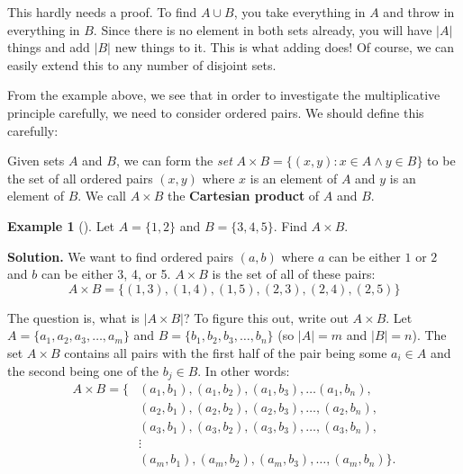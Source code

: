 \documentclass[10pt,]{book}
\newcommand{\terminology}[1]{\textbf{#1}}
\theoremstyle{plain}
\theoremstyle{definition}
\theoremstyle{definition}
\newtheorem{example}[theorem]{Example}
\theoremstyle{definition}
\theoremstyle{definition}
\numberwithin{equation}{chapter}
\newcommand{\st}{:}
\newcommand{\card}[1]{\left| #1 \right|}
\newcommand{\amp}{&}
\begin{document}
\hypertarget{p-709}{}%
This hardly needs a proof. To find \(A \cup B\), you take everything in \(A\) and throw in everything in \(B\). Since there is no element in both sets already, you will have \(\card{A}\) things and add \(\card{B}\) new things to it. This is what adding does! Of course, we can easily extend this to any number of disjoint sets.%
\par
\hypertarget{p-710}{}%
From the example above, we see that in order to investigate the multiplicative principle carefully, we need to consider ordered pairs. We should define this carefully:%
\begin{assemblage}\label{assemblage-14}
\hypertarget{p-711}{}%
Given sets \(A\) and \(B\), we can form the \emph{set} \(A \times B = \{(x,y) \st x \in A \wedge y \in B\}\) to be the set of all ordered pairs \((x,y)\) where \(x\) is an element of \(A\) and \(y\) is an element of \(B\). We call \(A \times B\) the \terminology{Cartesian product} of \(A\) and \(B\).%
\end{assemblage}
\begin{example}[]\label{example-40}
\hypertarget{p-712}{}%
Let \(A = \{1,2\}\) and \(B=\{3,4,5\}\). Find \(A \times B\).%
\par\smallskip%
\noindent\textbf{Solution.}\hypertarget{solution-81}{}\quad%
\hypertarget{p-713}{}%
We want to find ordered pairs \((a,b)\) where \(a\) can be either \(1\) or \(2\) and \(b\) can be either 3, 4, or 5. \(A \times B\) is the set of all of these pairs:%
\begin{equation*}
A \times B = \{(1,3), (1,4), (1,5), (2,3), (2,4), (2,5)\}
\end{equation*}
%
\end{example}
\hypertarget{p-714}{}%
The question is, what is \(\card{A \times B}\)? To figure this out, write out \(A \times B\). Let \(A = \{a_1,a_2, a_3, \ldots, a_m\}\) and \(B = \{b_1,b_2, b_3, \ldots, b_n\}\) (so \(\card{A} = m\) and \(\card{B} = n\)). The set \(A \times B\) contains all pairs with the first half of the pair being some \(a_i \in A\) and the second being one of the \(b_j \in B\). In other words:%
\begin{align*}
A \times B = \{ \amp (a_1, b_1), (a_1, b_2), (a_1, b_3), \ldots (a_1, b_n),\\
\amp (a_2, b_1), (a_2, b_2), (a_2, b_3), \ldots, (a_2, b_n),\\
\amp (a_3, b_1), (a_3, b_2), (a_3, b_3), \ldots, (a_3, b_n),\\
\amp \vdots\\
\amp (a_m, b_1), (a_m, b_2), (a_m, b_3), \ldots, (a_m, b_n)\}.
\end{align*}
\end{document}
